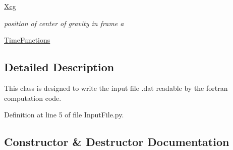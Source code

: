 \begin{DoxyCompactItemize}
\hyperlink{classgebtaero_1_1_input_file_1_1_input_file_a3e49397db5d15285d57c3df5311bf2f8}{Xcg}
\begin{DoxyCompactList}\small\item\em position of center of gravity in frame a \end{DoxyCompactList}\item 
\hyperlink{classgebtaero_1_1_input_file_1_1_input_file_a8e5da9f59ecc39d20885bf47fca12382}{Time\+Functions}
\end{DoxyCompactItemize}


\subsection{Detailed Description}
This class is designed to write the input file .dat readable by the fortran computation code. 

Definition at line 5 of file Input\+File.\+py.



\subsection{Constructor \& Destructor Documentation}
\mbox{\label{classgebtaero_1_1_input_file_1_1_input_file_ab2b0171273e5341d432bc98b59208afd}} 
